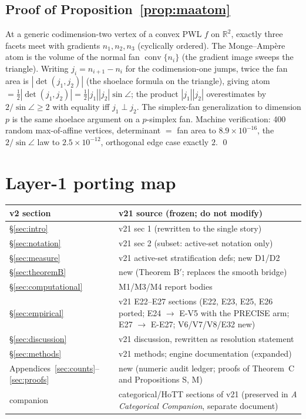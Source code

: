 \documentclass[11pt,a4paper]{article}
\theoremstyle{plain}
\theoremstyle{definition}
\theoremstyle{remark}
\newcommand{\RR}{\mathbb{R}}
\begin{document}
\subsection{Proof of Proposition~\ref{prop:maatom}}

At a generic codimension-two vertex of a convex PWL $f$ on
$\RR^2$, exactly three facets meet with gradients $n_1, n_2, n_3$
(cyclically ordered). The Monge--Amp\`ere atom is the volume of
the normal fan $\operatorname{conv}\{n_i\}$ (the gradient image
sweeps the triangle). Writing $j_i = n_{i+1} - n_i$ for the
codimension-one jumps, twice the fan area is $|\det(j_1, j_2)|$
(the shoelace formula on the triangle), giving atom $=
\tfrac12|\det(j_1, j_2)| = \tfrac12 |j_1||j_2| \sin\angle$; the
product $|j_1||j_2|$ overestimates by $2/\sin\angle \ge 2$ with
equality iff $j_1 \perp j_2$. The simplex-fan generalization to
dimension $p$ is the same shoelace argument on a $p$-simplex fan.
Machine verification: 400 random max-of-affine vertices,
determinant $=$ fan area to $8.9 \times 10^{-16}$, the
$2/\sin\angle$ law to $2.5 \times 10^{-12}$, orthogonal edge case
exactly $2$. \qed

\section{Layer-1 porting map}\label{sec:portmap}

\begin{tabularx}{\textwidth}{lX}
\toprule
\textbf{v2 section} & \textbf{v21 source (frozen; do not modify)} \\
\midrule
\S\ref{sec:intro} & v21 sec 1 (rewritten to the single story) \\
\S\ref{sec:notation} & v21 sec 2 (subset: active-set notation only) \\
\S\ref{sec:measure} & v21 active-set stratification defs; new D1/D2 \\
\S\ref{sec:theoremB} & new (Theorem B$'$; replaces the smooth bridge) \\
\S\ref{sec:computational} & M1/M3/M4 report bodies \\
\S\ref{sec:empirical} & v21 E22--E27 sections (E22, E23, E25, E26
      ported; E24 $\to$ E-V5 with the PRECISE arm; E27 $\to$ E-E27;
      V6/V7/V8/E32 new) \\
\S\ref{sec:discussion} & v21 discussion, rewritten as resolution statement \\
\S\ref{sec:methods} & v21 methods; engine documentation (expanded) \\
Appendices~\ref{sec:counts}--\ref{sec:proofs} & new (numeric audit
      ledger; proofs of Theorem~C and Propositions S, M) \\
companion & categorical/HoTT sections of v21 (preserved in
      \emph{A Categorical Companion}, separate document) \\
\bottomrule
\end{tabularx}
\end{document}
